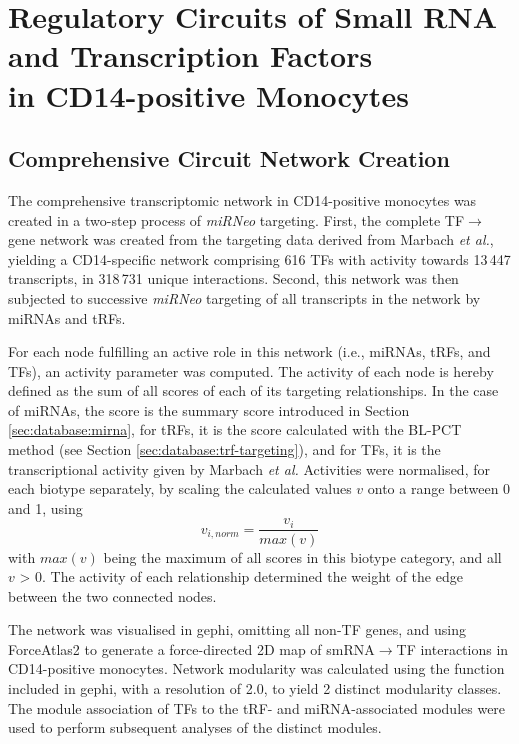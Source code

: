 \section{Regulatory Circuits of Small RNA and Transcription Factors\\ in CD14-positive Monocytes}

\begin{method}

\subsection{Comprehensive Circuit Network Creation} \label{sec:stroke:circuit-network}
The comprehensive transcriptomic network in CD14-positive monocytes was created in a two-step process of \emph{miRNeo} targeting. First, the complete TF$\to$gene network was created from the targeting data derived from Marbach \emph{et al.}\cite{Marbach2016}, yielding a CD14-specific network comprising 616 TFs with activity towards 13\,447 transcripts, in 318\,731 unique interactions. Second, this network was then subjected to successive \emph{miRNeo} targeting of all transcripts in the network by miRNAs and tRFs.

For each node fulfilling an active role in this network (i.e., miRNAs, tRFs, and TFs), an activity parameter was computed. The activity of each node is hereby defined as the sum of all scores of each of its targeting relationships. In the case of miRNAs, the score is the summary score introduced in Section \ref{sec:database:mirna}, for tRFs, it is the score calculated with the BL-PCT method (see Section \ref{sec:database:trf-targeting}), and for TFs, it is the transcriptional activity given by Marbach \emph{et al.}\cite{Marbach2016} Activities were normalised, for each biotype separately, by scaling the calculated values $v$ onto a range between 0 and 1, using $$v_{i, norm} = \frac{v_i}{max(v)}$$
with $max(v)$ being the maximum of all scores in this biotype category, and all $v$ > 0. The activity of each relationship determined the weight of the edge between the two connected nodes.

The network was visualised in gephi,\cite{Jacomy2014} omitting all non-TF genes, and using ForceAtlas2 to generate a force-directed 2D map of smRNA$\to$TF interactions in CD14-positive monocytes. Network modularity was calculated using the function included in gephi, with a resolution of 2.0, to yield 2 distinct modularity classes. The module association of TFs to the tRF- and miRNA-associated modules were used to perform subsequent analyses of the distinct modules. 


\end{method}
